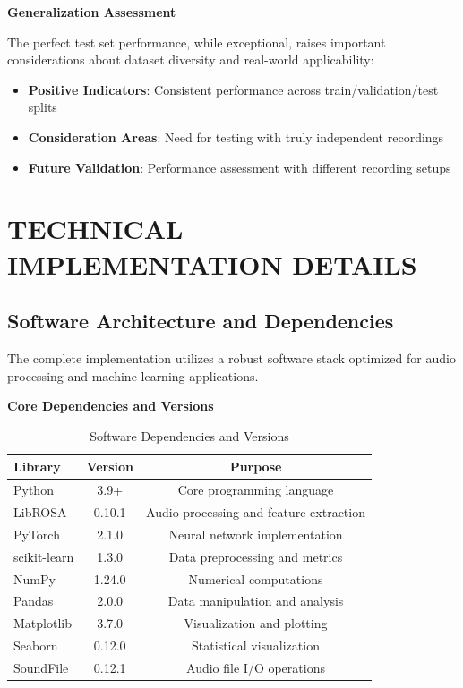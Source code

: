 \documentclass[12pt,a4paper]{article}
\begin{document}
\textbf{Generalization Assessment}

The perfect test set performance, while exceptional, raises important considerations about dataset diversity and real-world applicability:

\begin{itemize}
\item \textbf{Positive Indicators}: Consistent performance across train/validation/test splits
\item \textbf{Consideration Areas}: Need for testing with truly independent recordings
\item \textbf{Future Validation}: Performance assessment with different recording setups
\end{itemize}

\section{TECHNICAL IMPLEMENTATION DETAILS}

\subsection{Software Architecture and Dependencies}

The complete implementation utilizes a robust software stack optimized for audio processing and machine learning applications.

\textbf{Core Dependencies and Versions}

\begin{table}[H]
\centering
\caption{Software Dependencies and Versions}
\label{tab:software_dependencies}
\begin{tabular}{@{}lcc@{}}
\toprule
\textbf{Library} & \textbf{Version} & \textbf{Purpose} \\
\midrule
Python & 3.9+ & Core programming language \\
LibROSA & 0.10.1 & Audio processing and feature extraction \\
PyTorch & 2.1.0 & Neural network implementation \\
scikit-learn & 1.3.0 & Data preprocessing and metrics \\
NumPy & 1.24.0 & Numerical computations \\
Pandas & 2.0.0 & Data manipulation and analysis \\
Matplotlib & 3.7.0 & Visualization and plotting \\
Seaborn & 0.12.0 & Statistical visualization \\
SoundFile & 0.12.1 & Audio file I/O operations \\
\bottomrule
\end{tabular}
\end{table}
\end{document}
